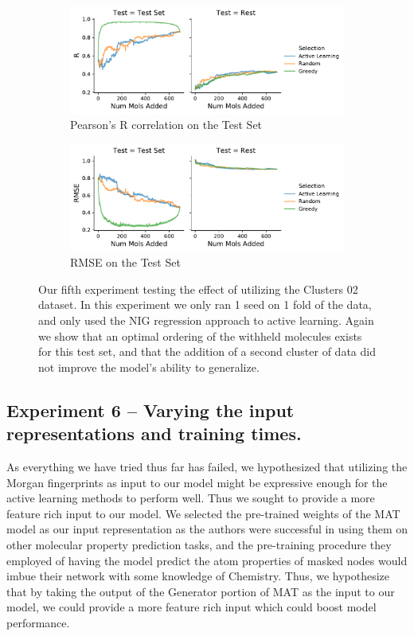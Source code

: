 \documentclass[journal=jmcmar,manuscript=article]{achemso}
\begin{document}
\begin{figure}[tbph]
    \centering
    \begin{subfigure}[b]{0.48\textwidth}
        \includegraphics[width=1\linewidth]{figures/fig5_lc02_R.pdf}
        \caption{Pearson's R correlation on the Test Set}
    \end{subfigure}%
    \hfill
    \begin{subfigure}[b]{0.48\textwidth}
        \includegraphics[width=1\linewidth]{figures/fig5_lc02_RMSE.pdf}
        \caption{RMSE on the Test Set}
    \end{subfigure}
    \caption{Our fifth experiment testing the effect of utilizing the Clusters 02 dataset. In this experiment we only ran 1 seed on 1 fold of the data, and only used the NIG regression approach to active learning. Again we show that an optimal ordering of the withheld molecules exists for this test set, and that the addition of a second cluster of data did not improve the model's ability to generalize.}
    \label{fig:lc02greed}
\end{figure}

\subsection{Experiment 6 -- Varying the input representations and training times.}

As everything we have tried thus far has failed, we hypothesized that utilizing the Morgan fingerprints as input to our model might be expressive enough for the active learning methods to perform well. Thus we sought to provide a more feature rich input to our model. We selected the pre-trained weights of the MAT model as our input representation as the authors were successful in using them on other molecular property prediction tasks, and the pre-training procedure they employed of having the model predict the atom properties of masked nodes would imbue their network with some knowledge of Chemistry. Thus, we hypothesize that by taking the output of the Generator portion of MAT as the input to our model, we could provide a more feature rich input which could boost model performance.
\end{document}
